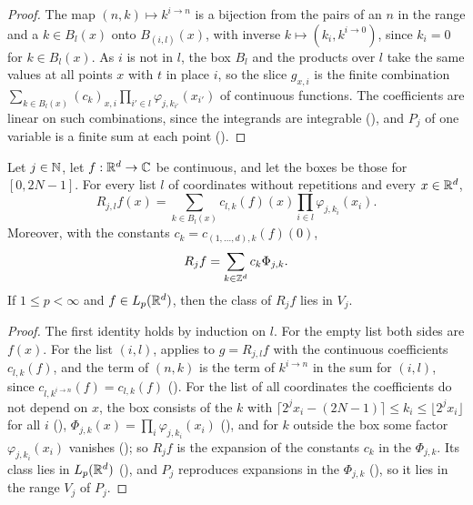 \begin{proof}
\leanok
{}
The map $(n, k) \mapsto k^{i \to n}$ is a bijection from the pairs of an $n$ in the range and a
$k \in B_l(x)$ onto $B_{(i,l)}(x)$, with inverse $k \mapsto (k_i, k^{i \to 0})$, since $k_i = 0$
for $k \in B_l(x)$. As $i$ is not in $l$, the box $B_l$ and the products over $l$ take the same
values at all points $x$ with $t$ in place $i$, so the slice $g_{x,i}$ is the finite combination
$\sum_{k \in B_l(x)} (c_k)_{x,i} \prod_{i' \in l} \varphi_{j,k_{i'}}(x_{i'})$ of continuous
functions. The coefficients are linear on such combinations, since the integrands are integrable
(), and $P_j$ of one variable is a finite sum at each point
().
\end{proof}

\begin{lemma}
\label{lem:daub-rd-tensor-form}
\leanok
{}
Let $j \in \mathbb{N}$, let $f : \mathbb{R}^d \to \mathbb{C}$ be continuous, and let the boxes be those for
$[0, 2N - 1]$. For every list $l$ of coordinates without repetitions and every $x \in \mathbb{R}^d$,
\[
  R_{j,l} f(x) = \sum_{k \in B_l(x)} c_{l,k}(f)(x) \prod_{i \in l} \varphi_{j,k_i}(x_i) .
\]
Moreover, with the constants $c_k = c_{(1, \dots, d),k}(f)(0)$,
\[
  R_j f = \sum_{k \in \mathbb{Z}^d} c_k \Phi_{j,k} .
\]
If $1 \leq p < \infty$ and $f \in L_p(\mathbb{R}^d)$, then the class of $R_j f$ lies in $V_j$.
\end{lemma}

\begin{proof}
\leanok
{}
The first identity holds by induction on $l$. For the empty list both sides are $f(x)$. For the
list $(i, l)$,  applies to $g = R_{j,l} f$ with the
continuous coefficients $c_{l,k}(f)$, and the term of $(n, k)$ is the term of $k^{i \to n}$ in the
sum for $(i, l)$, since $c_{l,k^{i \to n}}(f) = c_{l,k}(f)$ (). For
the list of all coordinates the coefficients do not depend on $x$, the box consists of the $k$
with $\lceil 2^j x_i - (2N - 1) \rceil \leq k_i \leq \lfloor 2^j x_i \rfloor$ for all $i$
(), $\Phi_{j,k}(x) = \prod_i \varphi_{j,k_i}(x_i)$
(), and for $k$ outside the box some factor
$\varphi_{j,k_i}(x_i)$ vanishes (); so
$R_j f$ is the expansion of the constants $c_k$ in the $\Phi_{j,k}$. Its class lies in
$L_p(\mathbb{R}^d)$ (), and $P_j$ reproduces expansions in the $\Phi_{j,k}$
(), so it lies in the range $V_j$ of $P_j$.
\end{proof}

